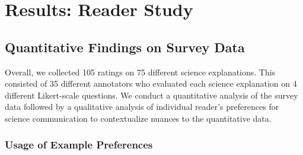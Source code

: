 \section{Results: Reader Study}




\subsection{Quantitative Findings on Survey Data}
Overall, we collected 105 ratings on 75 different science explanations. This consisted of 35 different annotators who evaluated each science explanation on 4 different Likert-scale questions. We conduct a quantitative analysis of the survey data followed by a qualitative analysis of individual reader's preferences for science communication to contextualize nuances to the quantitative data.




\subsubsection{Usage of Example Preferences}

